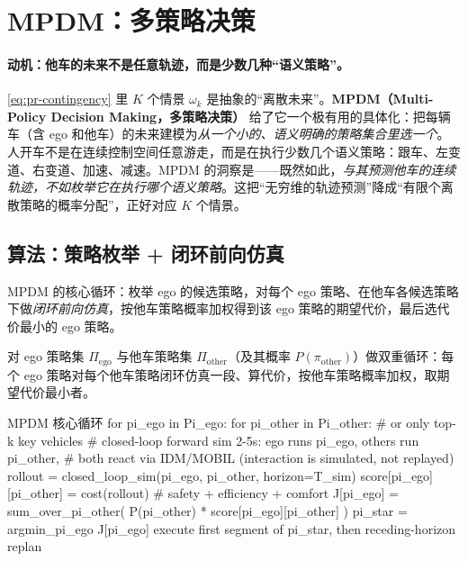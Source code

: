 \section{MPDM：多策略决策}
\label{sec:pr-mpdm}

\paragraph{动机：他车的未来不是任意轨迹，而是少数几种“语义策略”。}
\cref{eq:pr-contingency} 里 $K$ 个情景 $\omega_k$ 是抽象的“离散未来”。\textbf{MPDM（Multi-Policy Decision Making，多策略决策）}\cite{cunningham2015mpdm} 给了它一个极有用的具体化：把每辆车（含 ego 和他车）的未来建模为\emph{从一个小的、语义明确的策略集合里选一个}。人开车不是在连续控制空间任意游走，而是在执行少数几个语义策略：跟车、左变道、右变道、加速、减速。MPDM 的洞察是——既然如此，\emph{与其预测他车的连续轨迹，不如枚举它在执行哪个语义策略}。这把“无穷维的轨迹预测”降成“有限个离散策略的概率分配”，正好对应 $K$ 个情景。

\subsection{算法：策略枚举 + 闭环前向仿真}
\label{sec:pr-mpdm-algo}

MPDM 的核心循环：枚举 ego 的候选策略，对每个 ego 策略、在他车各候选策略下做\emph{闭环前向仿真}，按他车策略概率加权得到该 ego 策略的期望代价，最后选代价最小的 ego 策略\cite{cunningham2015mpdm}。

\begin{algo}\label{alg:pr-mpdm}
对 ego 策略集 $\Pi_{\mathrm{ego}}$ 与他车策略集 $\Pi_{\mathrm{other}}$（及其概率 $P(\pi_{\mathrm{other}})$）做双重循环：每个 ego 策略对每个他车策略闭环仿真一段、算代价，按他车策略概率加权，取期望代价最小者。
\end{algo}

\begin{codebox}[text]{MPDM 核心循环}
for pi_ego in Pi_ego:
    for pi_other in Pi_other:          # or only top-k key vehicles
        # closed-loop forward sim 2-5s: ego runs pi_ego, others run pi_other,
        # both react via IDM/MOBIL (interaction is simulated, not replayed)
        rollout = closed_loop_sim(pi_ego, pi_other, horizon=T_sim)
        score[pi_ego][pi_other] = cost(rollout)   # safety + efficiency + comfort
    J[pi_ego] = sum_over_pi_other( P(pi_other) * score[pi_ego][pi_other] )
pi_star = argmin_{pi_ego} J[pi_ego]
execute first segment of pi_star, then receding-horizon replan
\end{codebox}

